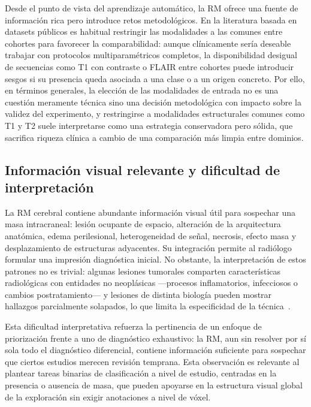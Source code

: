 Desde el punto de vista del aprendizaje automático, la RM ofrece una fuente de
información rica pero introduce retos metodológicos. En la literatura basada en
datasets públicos es habitual restringir las modalidades a las comunes entre
cohortes para favorecer la comparabilidad: aunque clínicamente sería deseable
trabajar con protocolos multiparamétricos completos, la disponibilidad desigual
de secuencias como T1 con contraste o FLAIR entre cohortes puede introducir
sesgos si su presencia queda asociada a una clase o a un origen concreto. Por
ello, en términos generales, la elección de las modalidades de entrada no es una
cuestión meramente técnica sino una decisión metodológica con impacto sobre la
validez del experimento, y restringirse a modalidades estructurales comunes como
T1 y T2 suele interpretarse como una estrategia conservadora pero sólida, que
sacrifica riqueza clínica a cambio de una comparación más limpia entre dominios.

\subsection{Información visual relevante y dificultad de interpretación}

La RM cerebral contiene abundante información visual útil para sospechar una masa
intracraneal: lesión ocupante de espacio, alteración de la arquitectura
anatómica, edema perilesional, heterogeneidad de señal, necrosis, efecto masa y
desplazamiento de estructuras adyacentes. Su integración permite al radiólogo
formular una impresión diagnóstica inicial. No obstante, la interpretación de
estos patrones no es trivial: algunas lesiones tumorales comparten características
radiológicas con entidades no neoplásicas ---procesos inflamatorios, infecciosos
o cambios postratamiento--- y lesiones de distinta biología pueden mostrar
hallazgos parcialmente solapados, lo que limita la especificidad de la
técnica~\cite{villanuevameyer2017imaging}.

Esta dificultad interpretativa refuerza la pertinencia de un enfoque de
priorización frente a uno de diagnóstico exhaustivo: la RM, aun sin resolver por
sí sola todo el diagnóstico diferencial, contiene información suficiente para
sospechar que ciertos estudios merecen revisión temprana. Esta observación es
relevante al plantear tareas binarias de clasificación a nivel de estudio,
centradas en la presencia o ausencia de masa, que pueden apoyarse en la estructura
visual global de la exploración sin exigir anotaciones a nivel de vóxel.

